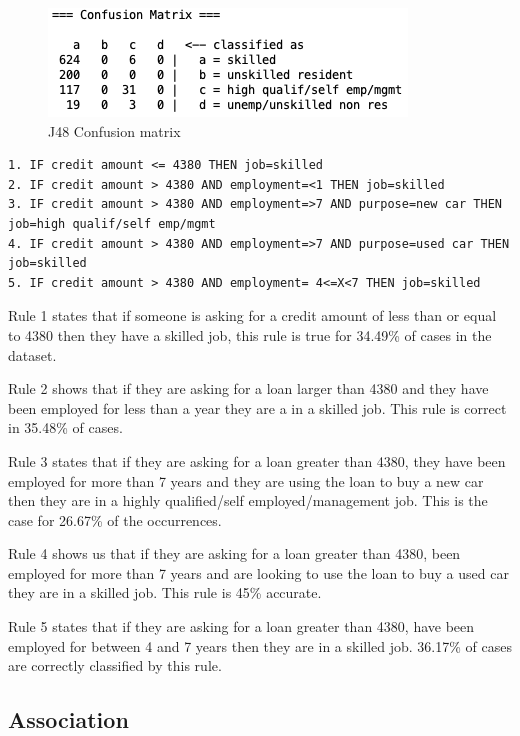 \documentclass[12pt]{article}
\begin{document}
\begin{figure}
    \centering
    \includegraphics[scale=0.75]{img/conf_matrix.png}
    \caption{J48 Confusion matrix}
    \label{fig:j48_conf_matrix}
\end{figure}

\begin{lstlisting}[caption="J48 rules"\label{fig:j48_rules}]
1. IF credit amount <= 4380 THEN job=skilled
2. IF credit amount > 4380 AND employment=<1 THEN job=skilled
3. IF credit amount > 4380 AND employment=>7 AND purpose=new car THEN job=high qualif/self emp/mgmt
4. IF credit amount > 4380 AND employment=>7 AND purpose=used car THEN job=skilled
5. IF credit amount > 4380 AND employment= 4<=X<7 THEN job=skilled
\end{lstlisting}

Rule 1 states that if someone is asking for a credit amount of less than or equal to 4380 then they have a skilled job, this rule is true for 34.49\% of cases in the dataset. 

Rule 2 shows that if they are asking for a loan larger than 4380 and they have been employed for less than a year they are a in a skilled job. This rule is correct in 35.48\% of cases.

Rule 3 states that if they are asking for a loan greater than 4380, they have been employed for more than 7 years and they are using the loan to buy a new car then they are in a highly qualified/self employed/management job. This is the case for 26.67\% of the occurrences.

Rule 4 shows us that if they are asking for a loan greater than 4380, been employed for more than 7 years and are looking to use the loan to buy a used car they are in a skilled job. This rule is 45\% accurate.

Rule 5 states that if they are asking for a loan greater than 4380, have been employed for between 4 and 7 years then they are in a skilled job. 36.17\% of cases are correctly classified by this rule.

\subsection{Association}
\end{document}
